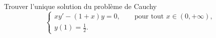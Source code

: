 
\begin{exercice}\label{exosession2-0004}

Trouver l'unique solution du problème de Cauchy 
\begin{equation*}
  \begin{cases}
    xy'-(1+x)y=0, \qquad \text{pour tout }x \in (0,+\infty), \\
    y(1)= \frac{1}{2}.
  \end{cases}
\end{equation*}



\end{exercice}

